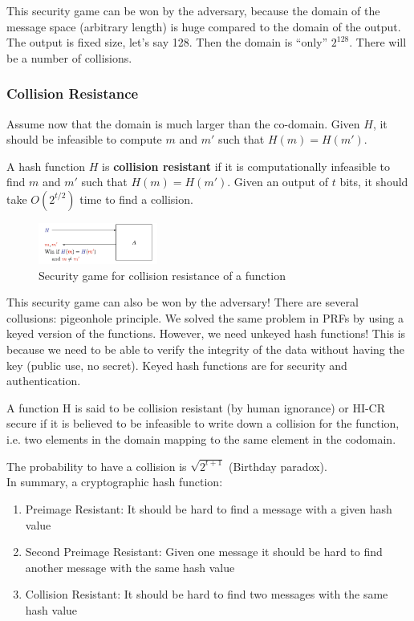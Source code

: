 This security game can be won by the adversary, because the domain of the message space (arbitrary length) is huge compared to the domain of the output. The output is fixed size, let's say 128. Then the domain is ``only'' $2^128$. There will be a number of collisions. 

\subsubsection{Collision Resistance}
Assume now that the domain is much larger than the co-domain. Given $H$, it should be infeasible to compute $m$ and $m'$ such that $H(m) = H(m')$.

\begin{defn}
    A hash function $H$ is \textbf{collision resistant} if it is computationally infeasible to find $m$ and $m'$ such that $H(m) = H(m')$.
    Given an output of $t$ bits, it should take $O(2^{t/2})$ time to find a collision.
\end{defn}

\begin{figure}[h!]
    \centering
    \includegraphics[width=0.35\textwidth]{img/col_resistance.png}
    \caption{Security game for collision resistance of a function}
\end{figure}

This security game can also be won by the adversary! There are several collusions: pigeonhole principle. We solved the same problem in PRFs by using a keyed version of the functions. However, we need unkeyed hash functions! This is because we need to be able to verify the integrity of the data without having the key (public use, no secret). Keyed hash functions are for security and authentication.

\begin{defn}
A function H is said to be collision resistant (by human
ignorance) or HI-CR secure if it is believed to be infeasible to write
down a collision for the function, i.e. two elements in the domain
mapping to the same element in the codomain.
\end{defn}

The probability to have a collision is $\sqrt{2^{t+1}}$ (Birthday paradox). \\

In summary, a cryptographic hash function:
\begin{enumerate}
    \item Preimage Resistant: It should be hard to find a message with
    a given hash value
    \item Second Preimage Resistant: Given one message it should be
    hard to find another message with the same hash value
    \item Collision Resistant: It should be hard to find two messages
    with the same hash value
\end{enumerate}

